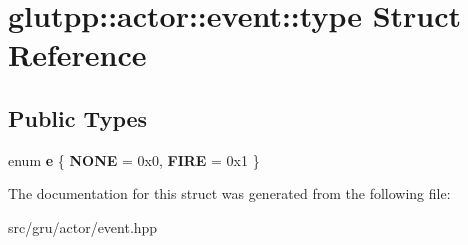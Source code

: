 \hypertarget{structglutpp_1_1actor_1_1event_1_1type}{\section{glutpp\-:\-:actor\-:\-:event\-:\-:type \-Struct \-Reference}
\label{structglutpp_1_1actor_1_1event_1_1type}
}
\subsection*{\-Public \-Types}
\begin{DoxyCompactItemize}
\item 
enum {\bfseries e} \{ {\bfseries \-N\-O\-N\-E} =  0x0, 
{\bfseries \-F\-I\-R\-E} =  0x1
 \}
\end{DoxyCompactItemize}


\-The documentation for this struct was generated from the following file\-:\begin{DoxyCompactItemize}
\item 
src/gru/actor/event.\-hpp\end{DoxyCompactItemize}
